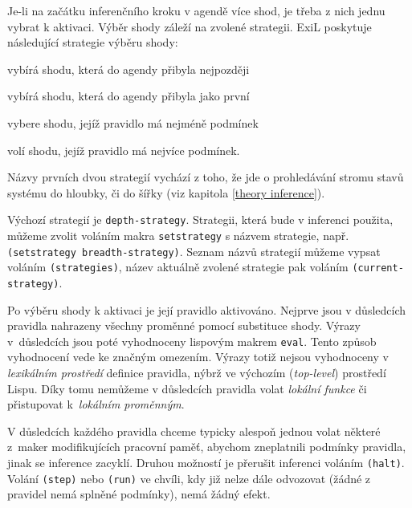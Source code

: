 Je-li na začátku inferenčního kroku v agendě více shod, je třeba z nich jednu
vybrat k aktivaci. Výběr shody záleží na zvolené strategii. ExiL poskytuje
následující strategie výběru shody:
\begin{description}[leftmargin=5cm,style=sameline,align=right,labelsep=0.5cm]
  \item[depth-strategy] vybírá shodu, která do agendy přibyla nejpozději
  \item[breadth-strategy] vybírá shodu, která do agendy přibyla jako první
  \item[simplicity-strategy] vybere shodu, jejíž pravidlo má nejméně podmínek
  \item[complexity-strategy] volí shodu, jejíž pravidlo má nejvíce podmínek.
\end{description}
Názvy prvních dvou strategií vychází z toho, že jde o prohledávání stromu
stavů systému do hloubky, či do šířky (viz kapitola \ref{theory inference}).

Výchozí strategií je \verb|depth-strategy|. Strategii, která bude v inferenci
použita, můžeme zvolit voláním makra \verb|setstrategy| s názvem strategie,
např. \verb|(setstrategy breadth-strategy)|. Seznam názvů strategií můžeme
vypsat voláním \verb|(strategies)|, název aktuálně zvolené strategie pak voláním
\verb|(current-strategy)|.

Po výběru shody k aktivaci je její pravidlo aktivováno. Nejprve jsou v
důsledcích pravidla nahrazeny všechny proměnné pomocí substituce shody. Výrazy
v~důsledcích jsou poté vyhodnoceny lispovým makrem \verb|eval|. Tento způsob
vyhodnocení vede ke značným omezením. Výrazy totiž nejsou vyhodnoceny v
\emph{lexikálním prostředí} definice pravidla, nýbrž ve výchozím
(\emph{top-level}) prostředí Lispu. Díky tomu nemůžeme v důsledcích pravidla
volat \emph{lokální funkce} či přistupovat k~\emph{lokálním proměnným}.

V důsledcích každého pravidla chceme typicky alespoň jednou volat některé
z~maker modifikujících pracovní paměť, abychom zneplatnili podmínky pravidla,
jinak se inference zacyklí. Druhou možností je přerušit inferenci voláním
\verb|(halt)|. Volání \verb|(step)| nebo \verb|(run)| ve chvíli, kdy již nelze
dále odvozovat (žádné z pravidel nemá splněné podmínky), nemá žádný efekt.
